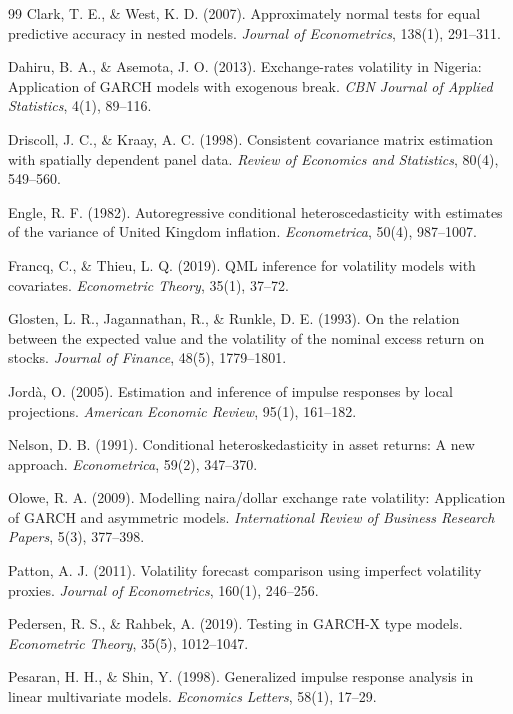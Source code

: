 \documentclass[11pt]{article}
\begin{document}
\begin{thebibliography}{99}
Clark, T. E., \& West, K. D. (2007). Approximately normal tests for equal predictive accuracy in nested models. \textit{Journal of Econometrics}, 138(1), 291--311.

Dahiru, B. A., \& Asemota, J. O. (2013). Exchange-rates volatility in Nigeria: Application of GARCH models with exogenous break. \textit{CBN Journal of Applied Statistics}, 4(1), 89--116.

Driscoll, J. C., \& Kraay, A. C. (1998). Consistent covariance matrix estimation with spatially dependent panel data. \textit{Review of Economics and Statistics}, 80(4), 549--560.

Engle, R. F. (1982). Autoregressive conditional heteroscedasticity with estimates of the variance of United Kingdom inflation. \textit{Econometrica}, 50(4), 987--1007.

Francq, C., \& Thieu, L. Q. (2019). QML inference for volatility models with covariates. \textit{Econometric Theory}, 35(1), 37--72.

Glosten, L. R., Jagannathan, R., \& Runkle, D. E. (1993). On the relation between the expected value and the volatility of the nominal excess return on stocks. \textit{Journal of Finance}, 48(5), 1779--1801.

Jordà, O. (2005). Estimation and inference of impulse responses by local projections. \textit{American Economic Review}, 95(1), 161--182.

Nelson, D. B. (1991). Conditional heteroskedasticity in asset returns: A new approach. \textit{Econometrica}, 59(2), 347--370.

Olowe, R. A. (2009). Modelling naira/dollar exchange rate volatility: Application of GARCH and asymmetric models. \textit{International Review of Business Research Papers}, 5(3), 377--398.

Patton, A. J. (2011). Volatility forecast comparison using imperfect volatility proxies. \textit{Journal of Econometrics}, 160(1), 246--256.

Pedersen, R. S., \& Rahbek, A. (2019). Testing in GARCH-X type models. \textit{Econometric Theory}, 35(5), 1012--1047.

Pesaran, H. H., \& Shin, Y. (1998). Generalized impulse response analysis in linear multivariate models. \textit{Economics Letters}, 58(1), 17--29.

\end{thebibliography}
\end{document}
